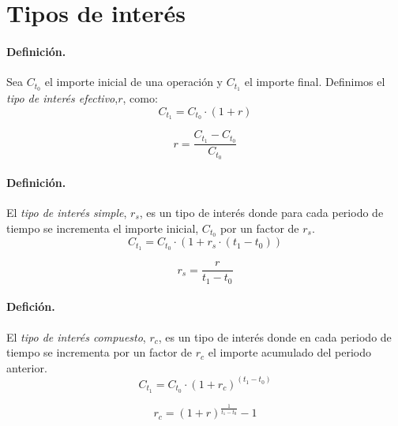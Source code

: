 
\section{Tipos de inter\'es}
\label{sec:interests}

\paragraph{Definici\'on.}
Sea $C_{t_0}$ el importe inicial de una operaci\'on y $C_{t_1}$ el importe final. 
Definimos el \emph{tipo de inter\'es efectivo},$r$,
como:
\begin{equation}
C_{t_1} = C_{t_0} \cdot (1+r)
\end{equation}

\begin{equation}
\label{tipus_efectiu}
r = \frac{C_{t_1}-C_{t_0}}{C_{t_0}}
\end{equation}

\paragraph{Definici\'on.}
El \emph{tipo de inter\'es simple}, $r_s$, es un tipo
de inter\'es donde para cada periodo de tiempo se incrementa el importe inicial, $C_{t_0}$
por un factor de $r_s$.
\begin{equation}
C_{t_1} = C_{t_0} \cdot (1+ r_s \cdot (t_1-t_0))
\end{equation}

\begin{equation}
\label{interes_simple_1}
r_s = \frac{r}{t_1 - t_0}
\end{equation}

\paragraph{Defici\'on.}
El \emph{tipo de inter\'es compuesto}, $r_c$, es un tipo
de inter\'es donde en cada periodo de tiempo se incrementa por un factor de $r_c$ el importe
acumulado del periodo anterior.
\begin{equation}
C_{t_1} = C_{t_0} \cdot (1+ r_c)^{(t_1-t_0)}
\end{equation}

\begin{equation}
\label{interes_compuesto_1}
r_c = (1 + r) ^ \frac{1}{t_1-t_0} - 1
\end{equation}


